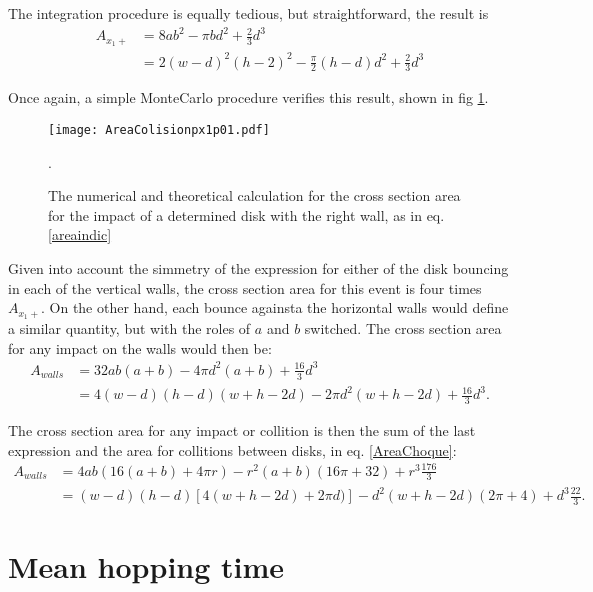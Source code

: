 \documentclass[a4paper,10pt, jcp, aps, preprint]{revtex4-1}
\begin{document}
The integration procedure is equally tedious, but
straightforward, the result is 
\begin{align}\label{areax1p}
 A_{x_1+} & = 8 a b^2-\pi b d^2 +\frac{2}{3}d^3 \\
  & = 2(w-d)^2 (h-2)^2- \frac{\pi}{2} (h-d) d^2 +\frac{2}{3}d^3 
\end{align}

Once again, a simple MonteCarlo procedure verifies this result,
shown in fig \ref{area1derecha}. 


\begin{figure}
\centering
\texttt{[image: AreaColisionpx1p01.pdf]}
\caption{The numerical and theoretical calculation for the cross section area
for the impact of a determined disk with the right wall, as in eq. \ref{areaindic} }
\label{area1derecha}.
\end{figure}


Given into account the simmetry of the expression for either of 
the disk bouncing in each of the vertical walls, the
cross section area for this event is four times $A_{x_1+}$. On
the other hand, each bounce againsta the horizontal walls would
define a similar quantity, but with the roles of $a$ and $b$ switched.
The cross section area for any impact on the walls would then be:
\begin{align}\label{areawalls}
 A_{walls} & = 32 a b (a+b)-4 \pi d^2 (a+b) +\frac{16}{3}d^3 \\
 &=  4 (w-d) (h-d)  (w+h-2d) -2 \pi d^2 (w + h-2 d) +\frac{16}{3}d^3. 
\end{align}

The cross section area for any impact or collition 
is then  the sum of the last expression
and the area for collitions between disks, in eq. \ref{AreaChoque}:
\begin{align}\label{areatotal}
 A_{walls} &= 4 a b (16(a+b) + 4\pi r)-r^2 (a+b)(16\pi+32)+r^3\frac{176}{3} \\ 
& = (w-d)(h-d)[4(w+h-2d)+2\pi d)]-d^2(w+h-2d)(2\pi+4)+d^3 \frac{22}{3}.
\end{align}




\section{Mean hopping time}
\end{document}
